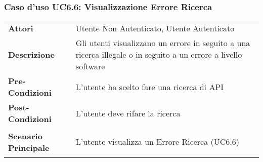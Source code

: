 \subsubsection{Caso d'uso UC6.6:  Visualizzazione Errore Ricerca}
\label{UC6_6}

\begin{tabular}{ l | p{11cm}}
	\hline
	\rowcolor{Gray}
	 \multicolumn{2}{c}{UC6.6 - Visualizzazione Errore Ricerca} \\
	 \hline
	\textbf{Attori} & Utente Non Autenticato, Utente Autenticato \\
	\textbf{Descrizione} & Gli utenti visualizzano un errore in seguito a una ricerca illegale o in seguito a un errore a livello software\\
	\textbf{Pre-Condizioni} & L'utente ha scelto fare una ricerca di API\\
	\textbf{Post-Condizioni} & L'utente deve rifare la ricerca\\
	\textbf{Scenario Principale} & 
	\begin{enumerate*}[label=(\arabic*.),itemjoin={\newline}]
		\item L'utente visualizza un Errore Ricerca (UC6.6)
	\end{enumerate*}\\
\end{tabular}